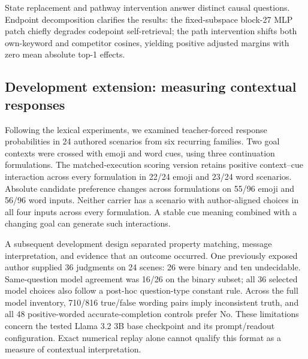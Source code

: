 \documentclass{article}
\begin{document}
State replacement and pathway intervention answer distinct causal
questions. Endpoint decomposition clarifies the results: the fixed-subspace block-27 MLP patch
chiefly degrades codepoint self-retrieval; the path intervention shifts both own-keyword and
competitor cosines, yielding positive adjusted margins with zero mean absolute
top-1 effects.

\subsection{Development extension: measuring contextual responses}
\label{sec:development}

Following the lexical experiments, we examined teacher-forced response
probabilities in 24 authored scenarios from six recurring families. Two goal
contexts were crossed with emoji and word cues, using three continuation
formulations. The matched-execution scoring version retains positive
context--cue interaction across every formulation in 22/24 emoji and 23/24
word scenarios. Absolute candidate preference changes across formulations
on 55/96 emoji and 56/96 word inputs. Neither carrier has a scenario with
author-aligned choices in all four inputs across every formulation. A stable
cue meaning combined with a changing goal can generate such interactions.

A subsequent development design separated property matching, message
interpretation, and evidence that an outcome occurred. One previously exposed
author supplied 36 judgments on 24 scenes: 26 were binary and ten undecidable.
Same-question model agreement was 16/26 on the binary subset; all 36 selected
model choices also follow a post-hoc question-type constant rule. Across the
full model inventory, 710/816 true/false wording pairs imply inconsistent
truth, and all 48 positive-worded accurate-completion controls prefer No.
These limitations concern the tested Llama 3.2 3B base checkpoint and its
prompt/readout configuration. Exact numerical replay alone cannot qualify
this format as a measure of contextual interpretation.
\end{document}
